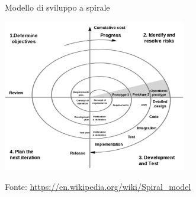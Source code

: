 \documentclass{beamer}
\begin{document}
\begin{frame}{\centerline{Modello di sviluppo a spirale}}

\begin{center}
\includegraphics[width=80mm]{P2023.AIBCCSS.IlConcettoDiSoftware/img-03.png}
\end{center}

\begin{center}
\tiny
Fonte: \url{https://en.wikipedia.org/wiki/Spiral\_model}
\end{center}

\end{frame}
\end{document}
